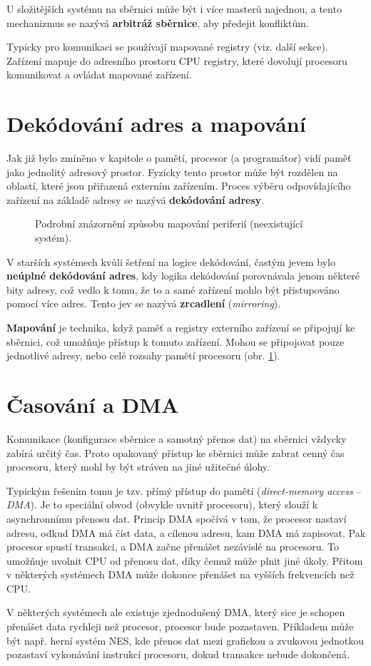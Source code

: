 U složitějších systému na sběrnici může být i více masterů najednou, a tento mechanizmus se nazývá
\textbf{arbitráž sběrnice}, aby předejit konfliktům.

Typicky pro komunikaci se používají mapované registry (viz. další sekce). Zařízení mapuje do
adresního prostoru CPU registry, které dovolují procesoru komunikovat a ovládat mapované zařízení.

\section{Dekódování adres a mapování}

Jak již bylo zmíněno v kapitole o pamětí, procesor (a programátor) vidí paměť jako jednolitý
adresový prostor. Fyzicky tento prostor může být rozdělen na oblastí, které jsou přiřazená externím
zařízením. Proces výběru odpovídajícího zařízení na základě adresy se nazývá \textbf{dekódování
adresy}.

\begin{figure}[H]
    \centering
    
    \caption{Podrobní znázornění způsobu mapování periferií (neexistující systém).}
    \label{fig:memory_map_ex}
\end{figure}

V starších systémech kvůli šetření na logice dekódování, častým jevem bylo \textbf{neúplné dekódování
adres}, kdy logika dekódování porovnávala jenom některé bity adresy, což vedlo k tomu, že to a samé
zařízení mohlo být přistupováno pomocí více adres. Tento jev se nazývá \textbf{zrcadlení}
(\textit{mirroring}).

\textbf{Mapování} je technika, když paměť a registry externího zařízení se připojují ke sběrnici,
což umožňuje přístup k tomuto zařízení. Mohou se připojovat pouze jednotlivé adresy, nebo celé
rozsahy pamětí procesoru (obr. \ref{fig:memory_map_ex}).

\section{Časování a DMA}

Komunikace (konfigurace sběrnice a samotný přenos dat) na sběrnici vždycky zabírá určitý čas. Proto
opakovaný přístup ke sběrnici může zabrat cenný čas procesoru, který mohl by být stráven na jiné
užitečné úlohy.

Typickým řešením tomu je tzv. přímý přístup do pamětí (\textit{direct-memory access} --
\textit{DMA}). Je to speciální obvod (obvykle uvnitř procesoru), který slouží k asynchronnímu
přenosu dat. Princip DMA spočívá v tom, že procesor nastaví adresu, odkud DMA má číst data, a
cílenou adresu, kam DMA má zapisovat. Pak procesor spustí transakci, a DMA začne přenášet nezávislé
na procesoru. To umožňuje uvolnit CPU od přenosu dat, díky čemuž může plnit jiné úkoly. Přitom v
některých systémech DMA může dokonce přenášet na vyšších frekvencích než CPU.

V některých systémech ale existuje zjednodušený DMA, který sice je schopen přenášet data rychleji
než procesor, procesor bude pozastaven. Příkladem může být např. herní systém NES, kde přenos dat
mezi grafickou a zvukovou jednotkou pozastaví vykonávání instrukcí procesoru, dokud transakce nebude
dokončená.
